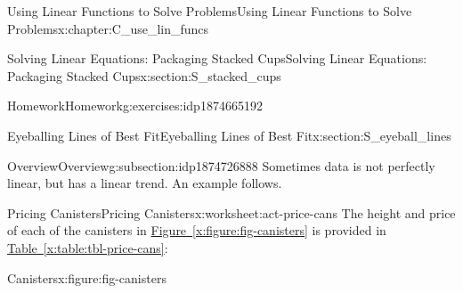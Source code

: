 \documentclass[oneside,10pt,]{book}
\newcommand{\xreffont}{\relax}
\numberwithin{equation}{chapter}
\begin{document}
\begin{chapterptx}{Using Linear Functions to Solve Problems}{}{Using Linear Functions to Solve Problems}{}{}{x:chapter:C_use_lin_funcs}
\begin{sectionptx}{Solving Linear Equations: Packaging Stacked Cups}{}{Solving Linear Equations: Packaging Stacked Cups}{}{}{x:section:S_stacked_cups}
\begin{exercises-subsection}{Homework}{}{Homework}{}{}{g:exercises:idp1874665192}
\end{exercises-subsection}
\end{sectionptx}
%
%
\typeout{************************************************}
\typeout{************************************************}
%
\begin{sectionptx}{Eyeballing Lines of Best Fit}{}{Eyeballing Lines of Best Fit}{}{}{x:section:S_eyeball_lines}
%
%
\typeout{************************************************}
\typeout{************************************************}
%
\begin{subsectionptx}{Overview}{}{Overview}{}{}{g:subsection:idp1874726888}
Sometimes data is not perfectly linear, but has a linear trend. An example follows.%
\end{subsectionptx}
%
%
\typeout{************************************************}
\typeout{************************************************}
%
\begin{worksheet-subsection}{Pricing Canisters}{}{Pricing Canisters}{}{}{x:worksheet:act-price-cans}
The height and price of each of the canisters in \hyperref[x:figure:fig-canisters]{Figure~{\xreffont\ref{x:figure:fig-canisters}}} is provided in \hyperref[x:table:tbl-price-cans]{Table~{\xreffont\ref{x:table:tbl-price-cans}}}:%
\begin{sidebyside}{2}{0}{0}{0}%
\begin{sbspanel}{0.5}%
\begin{figureptx}{Canisters}{x:figure:fig-canisters}{}%

\end{figureptx}
\end{sbspanel}
\end{sidebyside}
\end{worksheet-subsection}
\end{sectionptx}
\end{chapterptx}
\end{document}
